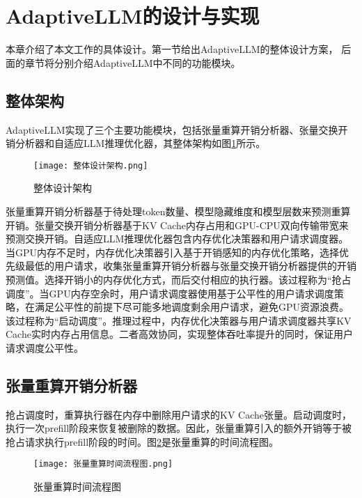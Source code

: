 \section{AdaptiveLLM的设计与实现}

本章介绍了本文工作的具体设计。第一节给出AdaptiveLLM的整体设计方案， 后面的章节将分别介绍AdaptiveLLM中不同的功能模块。

\subsection{整体架构}

AdaptiveLLM实现了三个主要功能模块，包括张量重算开销分析器、张量交换开销分析器和自适应LLM推理优化器，其整体架构如图\ref{Fig:整体设计架构}所示。

\begin{figure}[!htbp]
  \centering
  \texttt{[image: 整体设计架构.png]}
  \caption{整体设计架构}
  \label{Fig:整体设计架构}
\end{figure}

张量重算开销分析器基于待处理token数量、模型隐藏维度和模型层数来预测重算开销。张量交换开销分析器基于KV Cache内存占用和GPU-CPU双向传输带宽来预测交换开销。自适应LLM推理优化器包含内存优化决策器和用户请求调度器。当GPU内存不足时，内存优化决策器引入基于开销感知的内存优化策略，选择优先级最低的用户请求，收集张量重算开销分析器与张量交换开销分析器提供的开销预测值。选择开销小的内存优化方式，而后交付相应的执行器。该过程称为“抢占调度”。当GPU内存空余时，用户请求调度器使用基于公平性的用户请求调度策略，在满足公平性的前提下尽可能多地调度剩余用户请求，避免GPU资源浪费。该过程称为“启动调度”。推理过程中，内存优化决策器与用户请求调度器共享KV Cache实时内存占用信息。二者高效协同，实现整体吞吐率提升的同时，保证用户请求调度公平性。

\subsection{张量重算开销分析器}

抢占调度时，重算执行器在内存中删除用户请求的KV Cache张量。启动调度时，执行一次prefill阶段来恢复被删除的数据。因此，张量重算引入的额外开销等于被抢占请求执行prefill阶段的时间。图\ref{Fig:张量重算时间流程图}是张量重算的时间流程图。

\begin{figure}[!htbp]
  \centering
  \texttt{[image: 张量重算时间流程图.png]}
  \caption{张量重算时间流程图}
  \label{Fig:张量重算时间流程图}
\end{figure}

